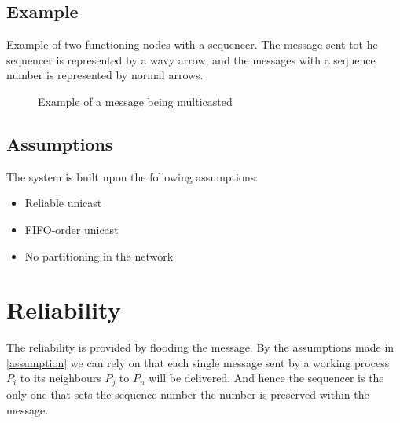 \documentclass{article}
\begin{document}
 \subsection{Example}
 Example of two functioning nodes with a sequencer. The message sent tot he sequencer is 
 represented by a wavy arrow, and the messages with a sequence number is represented by normal
 arrows.
  \begin{figure}[h]
    \centering
    \caption{Example of a message being multicasted}
    \label{fig1}
  \end{figure}
  
  \subsection{Assumptions}
  The system is built upon the following assumptions:
  \label{assumption}
  \begin{itemize}
  \item Reliable unicast
  \item FIFO-order unicast
  \item No partitioning in the network
  \end{itemize}  

\section{Reliability}
  \label{reliability}
  The reliability is provided by flooding the message. By the assumptions made in \ref{assumption} we can rely on 
  that each single message sent by a working process $P_i$ to its neighbours $P_j$ to $P_n$ will be delivered.
  And hence the sequencer is the only one that sets the sequence number the number is preserved within the message.
  
\end{document}
